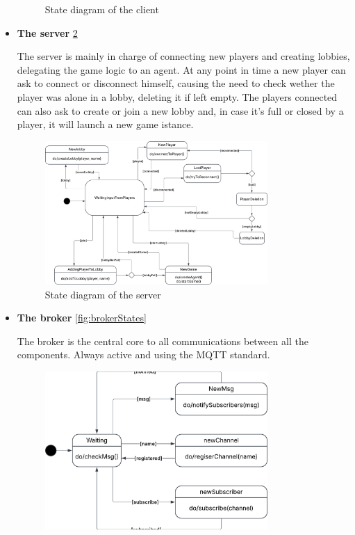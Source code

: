 \documentclass{scrartcl}
\begin{document}
\begin{itemize}
\begin{figure}[H]
    \caption{State diagram of the client} 
    \label{fig:clientStates}
  \end{figure}
  \item
  \textbf{The server} \cref{fig:serverStates} \par
  The server is mainly in charge of connecting new players and creating lobbies, 
  delegating the game logic to an agent. \newline
  At any point in time a new player can ask to connect or disconnect himself, causing the need to
  check wether the player was alone in a lobby, deleting it if left empty. The players connected 
  can also ask to create or join a new lobby and, in case it's full or closed by a player, 
  it will launch a new game istance.
  \begin{figure}[H]
    \centering
    \includegraphics[width=0.8\textwidth]{figures/serverStates.png}
    \caption{State diagram of the server} 
    \label{fig:serverStates}
  \end{figure}
  \item
  \textbf{The broker} \cref{fig:brokerStates} \par
  The broker is the central core to all communications between all the components.
  Always active and using the MQTT standard.
  \begin{figure}[H]
    \centering
    \includegraphics[width=0.8\textwidth]{figures/brokerStates.png}

\end{figure}
\end{itemize}
\end{document}

